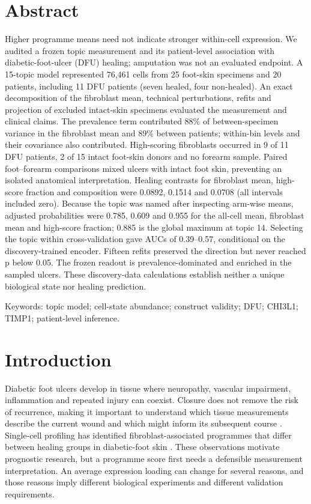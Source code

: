 \documentclass[10pt,a4paper]{article}
\begin{document}
\section*{Abstract}
\noindent Higher programme means need not indicate stronger within-cell expression. We audited a frozen topic measurement and its patient-level association with diabetic-foot-ulcer (DFU) healing; amputation was not an evaluated endpoint.
A 15-topic model represented 76,461 cells from 25 foot-skin specimens and 20 patients, including 11 DFU patients (seven healed, four non-healed). An exact decomposition of the fibroblast mean, technical perturbations, refits and projection of excluded intact-skin specimens evaluated the measurement and clinical claims.
The prevalence term contributed 88\% of between-specimen variance in the fibroblast mean and 89\% between patients; within-bin levels and their covariance also contributed. High-scoring fibroblasts occurred in 9 of 11 DFU patients, 2 of 15 intact foot-skin donors and no forearm sample. Paired foot--forearm comparisons mixed ulcers with intact foot skin, preventing an isolated anatomical interpretation. Healing contrasts for fibroblast mean, high-score fraction and composition were 0.0892, 0.1514 and 0.0708 (all intervals included zero). Because the topic was named after inspecting arm-wise means, adjusted probabilities were 0.785, 0.609 and 0.955 for the all-cell mean, fibroblast mean and high-score fraction; 0.885 is the global maximum at topic 14. Selecting the topic within cross-validation gave AUCs of 0.39--0.57, conditional on the discovery-trained encoder. Fifteen refits preserved the direction but never reached p below 0.05.
The frozen readout is prevalence-dominated and enriched in the sampled ulcers. These discovery-data calculations establish neither a unique biological state nor healing prediction.
\par\smallskip\noindent Keywords: topic model; cell-state abundance; construct validity; DFU; CHI3L1; TIMP1; patient-level inference.

\section{Introduction}
Diabetic foot ulcers develop in tissue where neuropathy, vascular impairment, inflammation and repeated injury can coexist. Closure does not remove the risk of recurrence, making it important to understand which tissue measurements describe the current wound and which might inform its subsequent course \citep{armstrong2017,wilkinson2020}. Single-cell profiling has identified fibroblast-associated programmes that differ between healing groups in diabetic-foot skin \citep{theocharidis2022,geo_gse165816}. These observations motivate prognostic research, but a programme score first needs a defensible measurement interpretation. An average expression loading can change for several reasons, and those reasons imply different biological experiments and different validation requirements.
\end{document}
